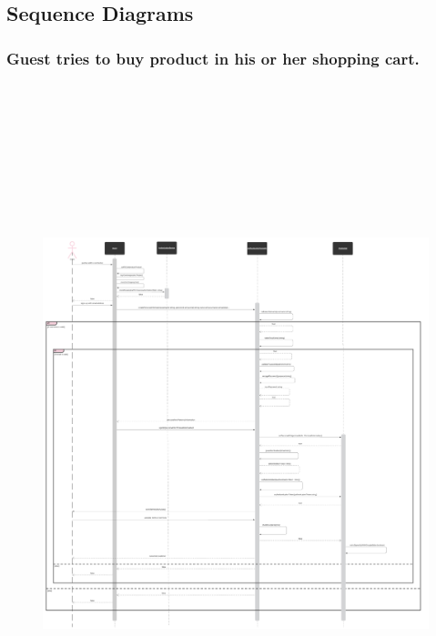 \documentclass[]{article}
\begin{document}
\hypertarget{sequence-diagrams}{%
    \subsection{Sequence Diagrams}\label{sequence-diagrams}}

\hypertarget{guest-tries-to-buy-product-in-his-or-her-shopping-cart.}{%
    \subsubsection{Guest tries to buy product in his or her shopping
        cart.}\label{guest-tries-to-buy-product-in-his-or-her-shopping-cart.}}

\begin{figure}[H]
    \centering
    \includegraphics[height=8in]{./images/52.png}
\end{figure}
\end{document}
